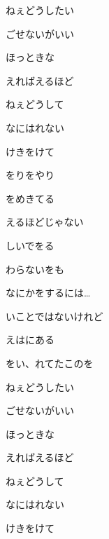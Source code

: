 \documentclass[a4paper,tate,twocolumn,12pt]{ltjtarticle}
\begin{document}
\begin{flushleft}
\begin{minipage}{\linewidth}
ねぇどうしたい

ごせないがいい

ほっときな

えればえるほど

ねぇどうして

なにはれない

けきをけて
\end{minipage}

\vspace{2em}

\noindent\begin{minipage}{\linewidth}
をりをやり

をめきてる

えるほどじゃない

しいでをる
\end{minipage}

\vspace{2em}

\noindent\begin{minipage}{\linewidth}
わらないをも

なにかをするには…

いことではないけれど

えはにある
\end{minipage}

\vspace{2em}

\noindent\begin{minipage}{\linewidth}
をい、れてたこのを

ねぇどうしたい

ごせないがいい

ほっときな

えればえるほど

ねぇどうして

なにはれない

けきをけて
\end{minipage}


\end{flushleft}
\end{document}
